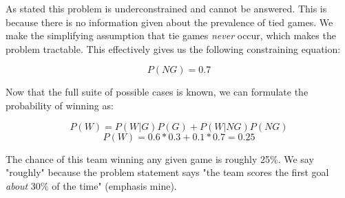\documentclass[12pt]{article}
\begin{document}
\begin{enumerate}[leftmargin=\labelsep]
  As stated this problem is underconstrained and cannot be answered. This is because there is no information given about the prevalence of tied games. We make the simplifying assumption that tie games \emph{never} occur, which makes the problem tractable. This effectively gives us the following constraining equation:

    \[ P(NG) = 0.7 \]

  Now that the full suite of possible cases is known, we can formulate the probability of winning as:

    \[ P(W) = P(W | G) P(G) + P(W | NG) P(NG) \]
    \[ P(W) = 0.6 * 0.3 + 0.1 * 0.7 = 0.25 \]

    The chance of this team winning any given game is roughly 25\%. We say "roughly" because the problem statement says "the team scores the first goal \emph{about} 30\% of the time" (emphasis mine).

\end{enumerate}
\end{document}
